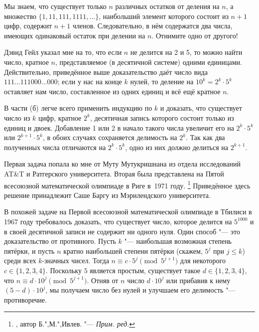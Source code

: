 \documentclass[twoside]{book}
\begin{document}
Мы знаем, что существует только $n$ различных остатков от деления на $n$, а множество $\{1, 11, 111, 1111,\dots\}$, наибольший элемент которого состоит из $n+1$ цифр, содержит $n+1$ членов.
Следовательно, в нём содержатся два числа, имеющих одинаковый остаток при делении на $n$.
Отнимите одно от другого!
\heart

Дэвид Гейл %
указал мне на то, %
что если $n$ не делится на 2 и 5, то можно найти число, кратное $n$, представляемое (в десятичной системе) одними единицами.
Действительно, приведённое выше доказательство даёт число вида $111\dots111000\dots000$; 
если у нас на конце $k$ нулей, то деление на $10^k=2^k\cdot 5^k$ оставляет нам число, составленное из одних единиц и всё ещё кратное $n$.

\medskip

В части (б) легче всего применить индукцию по $k$
и доказать, что существует число из $k$ цифр, кратное $2^k$, десятичная запись которого состоит только из единиц и двоек.
Добавление 1 или 2 в начало такого числа увеличит его на $2^k\cdot 5^k$ или $2^{k+1}\cdot 5^k$, в обоих случаях сохраняется делимость на $2^k$.
Так как два полученных числа отличаются на $2^k\cdot 5^k$, одно из них должно делиться на $2^{k+1}$.
\heart

Первая задача попала ко мне от Муту Мутукришнана %
из отдела исследований AT\&T и Ратгерского университета.
Вторая была представлена на Пятой всесоюзной математической олимпиаде в Риге в~1971 году.%
\footnote{\cite[№144]{ВсМО}, автор  Б.",М.",Ивлев. "--- \emph{Прим. ред.}}
Приведённое здесь решение принадлежит Саше Баргу %
из Мэрилендского университета.

\medskip

В похожей задаче на Первой всесоюзной математической олимпиаде в Тбилиси в 1967 году требовалось доказать, что существует число, которое делится на $5^{1000}$ и в своей десятичной записи не содержит ни одного нуля.
Один способ "--- это доказательство от противного.
Пусть $k$ "--- наибольшая возможная степень пятёрки, и пусть $n$ кратно наибольшей степени пятёрки (скажем, $5^j$ при $j\le k$)
среди всех $k$-значных чисел.
Тогда $n\equiv c\cdot 5^j\pmod{5^{j+1}}$ для некоторого $c\in\{1,2,3,4\}$.
Поскольку $5$ является простым, существует такое $d\in\{1,2,3,4\}$, что $n\equiv d\cdot 10^j\pmod{5^{j+1}}$.
Отняв от $n$ число $d\cdot 10^{j}$ или прибавив к нему $(5-d)\cdot 10^{j}$, мы получаем число без нулей и улучшаем его делимость "--- противоречие. %
\heart
\end{document}
